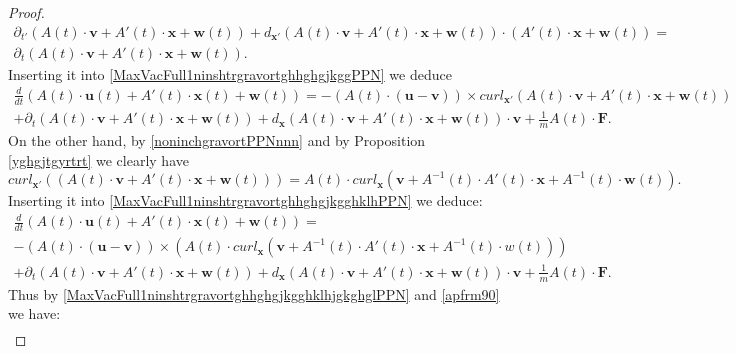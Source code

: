 \documentclass{article}
\theoremstyle{definition}
\theoremstyle{remark}
\renewcommand{\vec}[1]{\mathbf{#1}}
\newcommand{\er}{\eqref}
\newcommand{\er}{\eqref}
\begin{document}
\begin{proof}
\begin{multline}
\partial_{t'}\left(A(t)\cdot
\vec v+A'(t)\cdot\vec x+\vec w(t)\right)+d_{\vec x'}\left(A(t)\cdot
\vec v+A'(t)\cdot\vec x+\vec w(t)\right)\cdot\left(A'(t)\cdot\vec
x+\vec w(t)\right)=\\
\partial_{t}\left(A(t)\cdot \vec v+A'(t)\cdot\vec x+\vec
w(t)\right).
\end{multline}
Inserting it into \er{MaxVacFull1ninshtrgravortghhghgjkggPPN} we
deduce
\begin{multline}\label{MaxVacFull1ninshtrgravortghhghgjkgghklhPPN}
\frac{d}{dt}\left(A(t)\cdot \vec u(t)+A'(t)\cdot\vec x(t)+\vec
w(t)\right)=-\left(A(t)\cdot(\vec u-\vec v)\right)\times curl_{\vec
x'}\left(A(t)\cdot \vec v+A'(t)\cdot\vec x+\vec
w(t)\right)\\+\partial_{t}\left(A(t)\cdot \vec v+A'(t)\cdot\vec
x+\vec w(t)\right)+d_{\vec x}\left(A(t)\cdot \vec v+A'(t)\cdot\vec
x+\vec w(t)\right)\cdot \vec v+\frac{1}{m}A(t)\cdot\vec F.
\end{multline}
On the other hand, by \er{noninchgravortPPNnnn} and by Proposition
\ref{yghgjtgyrtrt}
we clearly have
\begin{equation}
\label{vyguiuiujggghjjgggorthjjhPPN} curl_{\vec x'}\left(
\left(A(t)\cdot\vec v+A'(t)\cdot\vec x+\vec
w(t)\right)\right)=A(t)\cdot curl_{\vec x}\left(\vec
v+A^{-1}(t)\cdot A'(t)\cdot\vec x+A^{-1}(t)\cdot \vec w(t)\right).
\end{equation}
Inserting it into \er{MaxVacFull1ninshtrgravortghhghgjkgghklhPPN} we
deduce:
\begin{multline}\label{MaxVacFull1ninshtrgravortghhghgjkgghklhjgkghglPPN}
\frac{d}{dt}\left(A(t)\cdot \vec u(t)+A'(t)\cdot\vec x(t)+\vec
w(t)\right)=\\-\left(A(t)\cdot(\vec u-\vec
v)\right)\times\left(A(t)\cdot curl_{\vec x}\left(\vec
v+A^{-1}(t)\cdot A'(t)\cdot\vec x+A^{-1}(t)\cdot
w(t)\right)\right)\\+\partial_{t}\left(A(t)\cdot \vec
v+A'(t)\cdot\vec x+\vec w(t)\right)+d_{\vec x}\left(A(t)\cdot \vec
v+A'(t)\cdot\vec x+\vec w(t)\right)\cdot \vec
v+\frac{1}{m}A(t)\cdot\vec F.
\end{multline}
Thus by \er{MaxVacFull1ninshtrgravortghhghgjkgghklhjgkghglPPN} and
\er{apfrm90} we have:
\begin{multline}\label{MaxVacFull1ninshtrgravortghhghgjkgghklhjgkghgPPN}

\end{multline}
\end{proof}
\end{document}
